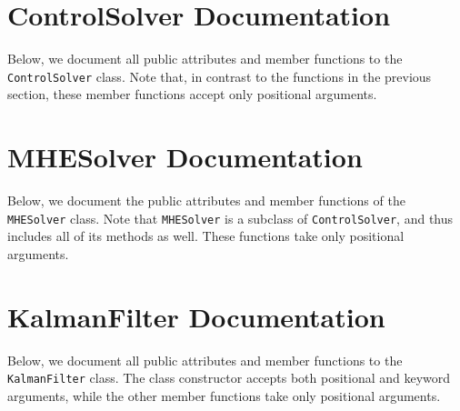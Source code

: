 \documentclass{article}
\begin{document}


\section{ControlSolver Documentation} \label{sec:ControlSolver}

Below, we document all public attributes and member functions to the \texttt{ControlSolver} class.
Note that, in contrast to the functions in the previous section, these member functions accept only positional arguments.



\section{MHESolver Documentation}

Below, we document the public attributes and member functions of the \texttt{MHESolver} class.
Note that \texttt{MHESolver} is a subclass of \texttt{ControlSolver}, and thus includes all of its methods as well.
These functions take only positional arguments.



\section{KalmanFilter Documentation}

Below, we document all public attributes and member functions to the \texttt{KalmanFilter} class.
The class constructor accepts both positional and keyword arguments, while the other member functions take only positional arguments.


\end{document}
